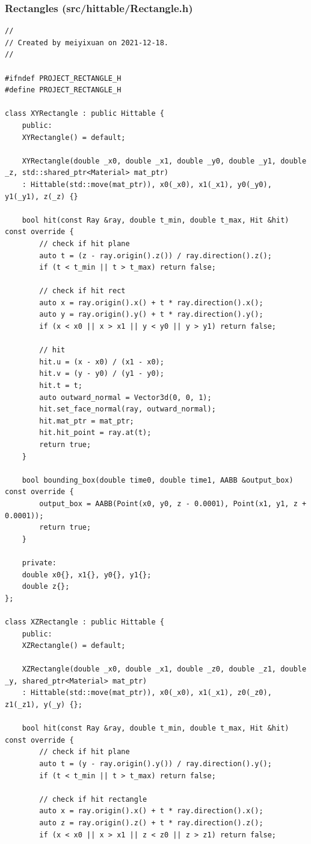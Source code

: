 \documentclass[utf8]{article}
\begin{document}
\subsubsection{Rectangles (src/hittable/Rectangle.h)}
\begin{lstlisting}[style=CStyle]
//
// Created by meiyixuan on 2021-12-18.
//

#ifndef PROJECT_RECTANGLE_H
#define PROJECT_RECTANGLE_H

class XYRectangle : public Hittable {
	public:
	XYRectangle() = default;
	
	XYRectangle(double _x0, double _x1, double _y0, double _y1, double _z, std::shared_ptr<Material> mat_ptr)
	: Hittable(std::move(mat_ptr)), x0(_x0), x1(_x1), y0(_y0), y1(_y1), z(_z) {}
	
	bool hit(const Ray &ray, double t_min, double t_max, Hit &hit) const override {
		// check if hit plane
		auto t = (z - ray.origin().z()) / ray.direction().z();
		if (t < t_min || t > t_max) return false;
		
		// check if hit rect
		auto x = ray.origin().x() + t * ray.direction().x();
		auto y = ray.origin().y() + t * ray.direction().y();
		if (x < x0 || x > x1 || y < y0 || y > y1) return false;
		
		// hit
		hit.u = (x - x0) / (x1 - x0);
		hit.v = (y - y0) / (y1 - y0);
		hit.t = t;
		auto outward_normal = Vector3d(0, 0, 1);
		hit.set_face_normal(ray, outward_normal);
		hit.mat_ptr = mat_ptr;
		hit.hit_point = ray.at(t);
		return true;
	}
	
	bool bounding_box(double time0, double time1, AABB &output_box) const override {
		output_box = AABB(Point(x0, y0, z - 0.0001), Point(x1, y1, z + 0.0001));
		return true;
	}
	
	private:
	double x0{}, x1{}, y0{}, y1{};
	double z{};
};

class XZRectangle : public Hittable {
	public:
	XZRectangle() = default;
	
	XZRectangle(double _x0, double _x1, double _z0, double _z1, double _y, shared_ptr<Material> mat_ptr)
	: Hittable(std::move(mat_ptr)), x0(_x0), x1(_x1), z0(_z0), z1(_z1), y(_y) {};
	
	bool hit(const Ray &ray, double t_min, double t_max, Hit &hit) const override {
		// check if hit plane
		auto t = (y - ray.origin().y()) / ray.direction().y();
		if (t < t_min || t > t_max) return false;
		
		// check if hit rectangle
		auto x = ray.origin().x() + t * ray.direction().x();
		auto z = ray.origin().z() + t * ray.direction().z();
		if (x < x0 || x > x1 || z < z0 || z > z1) return false;
		

\end{lstlisting}
\end{document}

